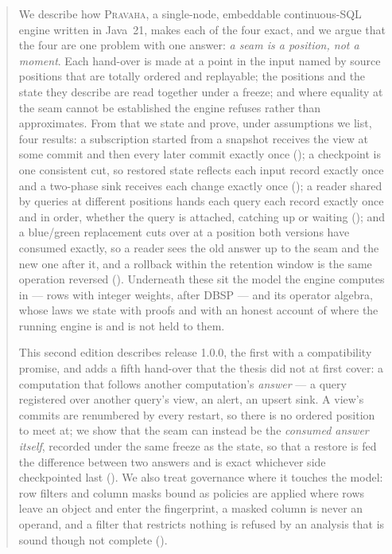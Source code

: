 \documentclass[11pt,a4paper]{article}
\renewcommand{\_}{\oldunderscore\allowbreak}
\newcommand{\Pv}{\textsc{Pravaha}}
\begin{document}
\begin{abstract}
We describe how \Pv, a single-node, embeddable continuous-SQL engine written in Java~21, makes each
of the four exact, and we argue that the four are one problem with one answer: \emph{a seam is a
position, not a moment}. Each hand-over is made at a point in the input named by source positions
that are totally ordered and replayable; the positions and the state they describe are read together
under a freeze; and where equality at the seam cannot be established the engine refuses rather than
approximates. From that we state and prove, under assumptions we list, four results: a subscription
started from a snapshot receives the view at some commit and then every later commit exactly once
(); a checkpoint is one consistent cut, so restored state reflects each input
record exactly once and a two-phase sink receives each change exactly once ();
a reader shared by queries at different positions hands each query each record exactly once and in
order, whether the query is attached, catching up or waiting (); and a blue/green
replacement cuts over at a position both versions have consumed exactly, so a reader sees the old
answer up to the seam and the new one after it, and a rollback within the retention window is the
same operation reversed (). Underneath these sit the model the engine computes
in --- rows with integer weights, after DBSP --- and its operator algebra, whose laws we state with
proofs and with an honest account of where the running engine is and is not held to them.

This second edition describes release 1.0.0, the first with a compatibility promise, and adds a fifth
hand-over that the thesis did not at first cover: a computation that follows another computation's
\emph{answer} --- a query registered over another query's view, an alert, an upsert sink. A view's
commits are renumbered by every restart, so there is no ordered position to meet at; we show that the
seam can instead be the \emph{consumed answer itself}, recorded under the same freeze as the state, so
that a restore is fed the difference between two answers and is exact whichever side checkpointed last
(). We also treat governance where it touches the model: row filters and column masks
bound as policies are applied where rows leave an object and enter the fingerprint, a masked column is
never an operand, and a filter that restricts nothing is refused by an analysis that is sound though not
complete ().


\end{abstract}
\end{document}
